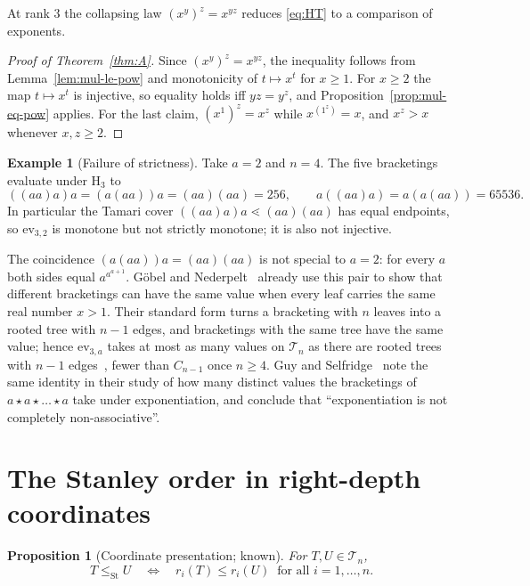 \documentclass[11pt,a4paper]{article}
\theoremstyle{plain}
\newtheorem{proposition}[theorem]{Proposition}
\theoremstyle{definition}
\newtheorem{example}[theorem]{Example}
\newcommand{\HH}{\mathrm{H}}
\newcommand{\ev}{\mathrm{ev}}
\newcommand{\Tam}{\mathcal{T}}
\newcommand{\St}{\mathrm{St}}
\begin{document}
At rank $3$ the collapsing law $(x^{y})^{z}=x^{yz}$ reduces \eqref{eq:HT} to a
comparison of exponents.


\begin{proof}[Proof of Theorem~\ref{thm:A}]
Since $(x^{y})^{z}=x^{yz}$, the inequality follows from
Lemma~\ref{lem:mul-le-pow} and monotonicity of $t\mapsto x^{t}$ for $x\ge1$.
For $x\ge2$ the map $t\mapsto x^{t}$ is injective, so equality holds iff
$yz=y^{z}$, and Proposition~\ref{prop:mul-eq-pow} applies. For the last claim,
$(x^{1})^{z}=x^{z}$ while $x^{(1^{z})}=x$, and $x^{z}>x$ whenever $x,z\ge2$.
\end{proof}

\begin{example}[Failure of strictness]\label{ex:collide}
Take $a=2$ and $n=4$. The five bracketings evaluate under $\HH_3$ to
\[
  ((aa)a)a=(a(aa))a=(aa)(aa)=256,
  \qquad
  a((aa)a)=a(a(aa))=65536 .
\]
In particular the Tamari cover $((aa)a)a\lessdot(aa)(aa)$ has equal endpoints,
so $\ev_{3,2}$ is monotone but not strictly monotone; it is also not injective.
\end{example}

The coincidence $(a(aa))a=(aa)(aa)$ is not special to $a=2$: for every $a$ both sides
equal $a^{a^{a+1}}$. G\"obel and Nederpelt~\cite{GN} already use this pair to show that
different bracketings can have the same value when every leaf carries the same real
number $x>1$. Their standard form turns a bracketing with $n$ leaves into a rooted tree
with $n-1$ edges, and bracketings with the same tree have the same value; hence
$\ev_{3,a}$ takes at most as many values on $\Tam_n$ as there are rooted trees with
$n-1$ edges~\cite[Theorem~2.2]{GN}, fewer than $C_{n-1}$ once $n\ge4$. Guy and
Selfridge~\cite{GS} note the same identity in their study of how many distinct values
the bracketings of $a\star a\star\dots\star a$ take under exponentiation, and conclude
that ``exponentiation is not completely non-associative''.
\section{The Stanley order in right-depth coordinates}\label{sec:coord}

\begin{proposition}[Coordinate presentation; known]\label{prop:coord}
For $T,U\in\Tam_n$,
\[
  T\le_{\St}U
  \quad\Longleftrightarrow\quad
  r_i(T)\le r_i(U)\ \text{ for all } i=1,\dots,n .
\]
\end{proposition}
\end{document}
